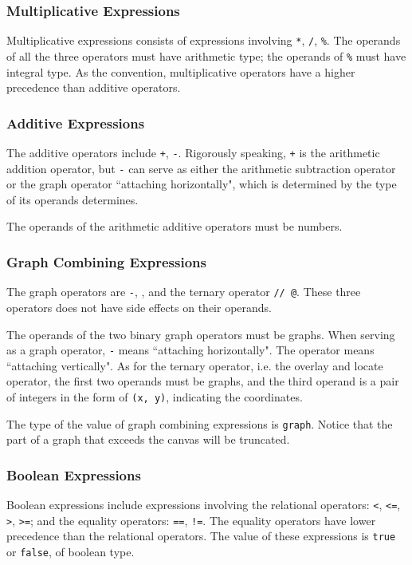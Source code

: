 \documentclass[11pt,letterpaper]{article}
\begin{document}
\subsubsection {Multiplicative Expressions}
Multiplicative expressions consists of expressions involving \texttt{*}, \texttt{/}, \texttt{\%}. The operands of all the three operators must have arithmetic type; the operands of \texttt{\%} must have integral type. As the convention, multiplicative operators have a higher precedence than additive operators. 

\subsubsection {Additive Expressions}
The additive operators include \texttt{+}, \texttt{-}. Rigorously speaking, \texttt{+} is the arithmetic addition operator, but \texttt{-} can serve as either the arithmetic subtraction operator or the graph operator ``attaching horizontally", which is determined by the type of its operands determines.

The operands of the arithmetic additive operators must be numbers.

\subsubsection {Graph Combining Expressions}
The graph operators are \texttt{-}, \texttt{\textbar}, and the ternary operator \texttt{// @}. These three operators does not have side effects on their operands.

The operands of the two binary graph operators must be graphs. When serving as a graph operator, \texttt{-} means  ``attaching horizontally". The operator \texttt{\textbar} means ``attaching vertically". As for the ternary operator, i.e. the overlay and locate operator, the first two operands must be graphs, and the third operand is a pair of integers in the form of \texttt{(x, y)}, indicating the coordinates.

The type of the value of graph combining expressions is \texttt{graph}. Notice that the part of a graph that exceeds the canvas will be truncated.

\subsubsection {Boolean Expressions}
Boolean expressions include expressions involving the relational operators:  \texttt {\textless},  \texttt {\textless=},  \texttt{\textgreater},  \texttt{\textgreater=};  and the equality operators: \texttt{==}, \texttt{!=}. The equality operators have lower precedence than the relational operators. The value of these expressions is \texttt{true} or \texttt{false}, of boolean type.
\end{document}
